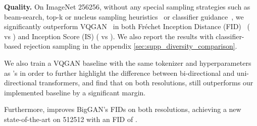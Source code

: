 \noindent\textbf{Quality.}
On ImageNet 256256, without any special sampling strategies such as beam-search, top-k or nucleus sampling heuristics~\cite{holtzman2019nucleus} or classifier guidance~\cite{Razavi19vqvae2}, we significantly outperform VQGAN~\cite{Esser21vqgan} in both Fr\'{e}chet Inception Distance (FID)~\cite{FID} ( vs ) and Inception Score (IS) ( vs ). We also report the results with classifier-based rejection sampling in the appendix \ref{sec:supp_diversity_comparison}. 

We also train a VQGAN baseline with the same tokenizer and hyperparameters as \model's in order to further highlight the difference between bi-directional and uni-directional transformers, and find that on both resolutions, \model still outperforms our implemented baseline by a significant margin. 

Furthermore, \model improves BigGAN's FIDs on both resolutions, achieving a new state-of-the-art on 512512 with an FID of .

